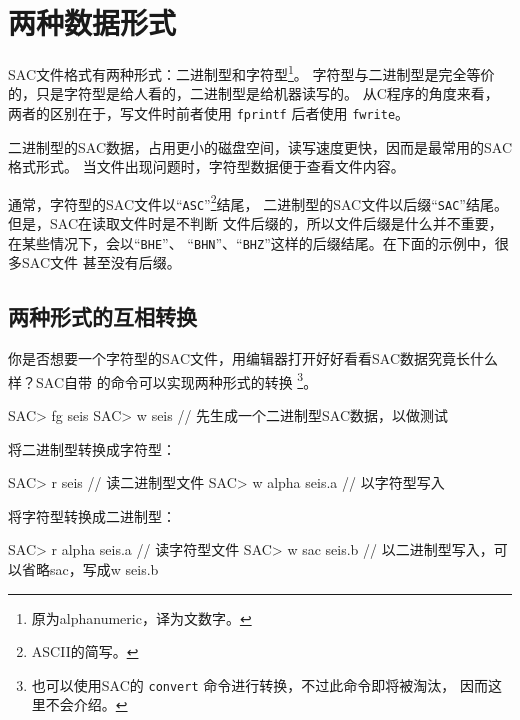 \section{两种数据形式}
SAC文件格式有两种形式：二进制型和字符型\footnote{原为alphanumeric，译为文数字。}。
字符型与二进制型是完全等价的，只是字符型是给人看的，二进制型是给机器读写的。
从C程序的角度来看，两者的区别在于，写文件时前者使用 \texttt{fprintf} 后者使用 \texttt{fwrite}。

二进制型的SAC数据，占用更小的磁盘空间，读写速度更快，因而是最常用的SAC格式形式。
当文件出现问题时，字符型数据便于查看文件内容。

通常，字符型的SAC文件以``\texttt{ASC}''\footnote{ASCII的简写。}结尾，
二进制型的SAC文件以后缀``\texttt{SAC}''结尾。但是，SAC在读取文件时是不判断
文件后缀的，所以文件后缀是什么并不重要，在某些情况下，会以``\texttt{BHE}''、
``\texttt{BHN}''、``\texttt{BHZ}''这样的后缀结尾。在下面的示例中，很多SAC文件
甚至没有后缀。

\subsection{两种形式的互相转换}
你是否想要一个字符型的SAC文件，用编辑器打开好好看看SAC数据究竟长什么样？SAC自带
的命令可以实现两种形式的转换
\footnote{也可以使用SAC的 \texttt{convert} 命令进行转换，不过此命令即将被淘汰，
因而这里不会介绍。}。
\begin{SACCode}
SAC> fg seis
SAC> w seis             // 先生成一个二进制型SAC数据，以做测试
\end{SACCode}

将二进制型转换成字符型：
\begin{SACCode}
SAC> r seis             // 读二进制型文件
SAC> w alpha seis.a     // 以字符型写入
\end{SACCode}

将字符型转换成二进制型：
\begin{SACCode}
SAC> r alpha seis.a     // 读字符型文件
SAC> w sac seis.b       // 以二进制型写入，可以省略sac，写成w seis.b
\end{SACCode}

